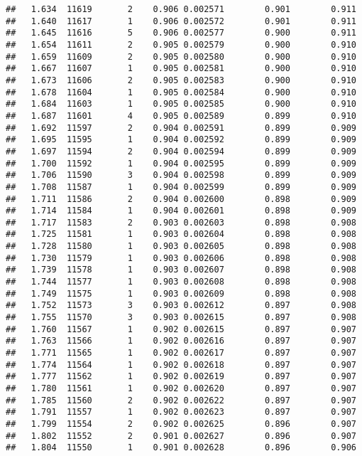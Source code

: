 \documentclass[
]{book}
\begin{document}
\begin{verbatim}
##   1.634  11619       2    0.906 0.002571        0.901        0.911
##   1.640  11617       1    0.906 0.002572        0.901        0.911
##   1.645  11616       5    0.906 0.002577        0.900        0.911
##   1.654  11611       2    0.905 0.002579        0.900        0.910
##   1.659  11609       2    0.905 0.002580        0.900        0.910
##   1.667  11607       1    0.905 0.002581        0.900        0.910
##   1.673  11606       2    0.905 0.002583        0.900        0.910
##   1.678  11604       1    0.905 0.002584        0.900        0.910
##   1.684  11603       1    0.905 0.002585        0.900        0.910
##   1.687  11601       4    0.905 0.002589        0.899        0.910
##   1.692  11597       2    0.904 0.002591        0.899        0.909
##   1.695  11595       1    0.904 0.002592        0.899        0.909
##   1.697  11594       2    0.904 0.002594        0.899        0.909
##   1.700  11592       1    0.904 0.002595        0.899        0.909
##   1.706  11590       3    0.904 0.002598        0.899        0.909
##   1.708  11587       1    0.904 0.002599        0.899        0.909
##   1.711  11586       2    0.904 0.002600        0.898        0.909
##   1.714  11584       1    0.904 0.002601        0.898        0.909
##   1.717  11583       2    0.903 0.002603        0.898        0.908
##   1.725  11581       1    0.903 0.002604        0.898        0.908
##   1.728  11580       1    0.903 0.002605        0.898        0.908
##   1.730  11579       1    0.903 0.002606        0.898        0.908
##   1.739  11578       1    0.903 0.002607        0.898        0.908
##   1.744  11577       1    0.903 0.002608        0.898        0.908
##   1.749  11575       1    0.903 0.002609        0.898        0.908
##   1.752  11573       3    0.903 0.002612        0.897        0.908
##   1.755  11570       3    0.903 0.002615        0.897        0.908
##   1.760  11567       1    0.902 0.002615        0.897        0.907
##   1.763  11566       1    0.902 0.002616        0.897        0.907
##   1.771  11565       1    0.902 0.002617        0.897        0.907
##   1.774  11564       1    0.902 0.002618        0.897        0.907
##   1.777  11562       1    0.902 0.002619        0.897        0.907
##   1.780  11561       1    0.902 0.002620        0.897        0.907
##   1.785  11560       2    0.902 0.002622        0.897        0.907
##   1.791  11557       1    0.902 0.002623        0.897        0.907
##   1.799  11554       2    0.902 0.002625        0.896        0.907
##   1.802  11552       2    0.901 0.002627        0.896        0.907
##   1.804  11550       1    0.901 0.002628        0.896        0.906

\end{verbatim}
\end{document}
